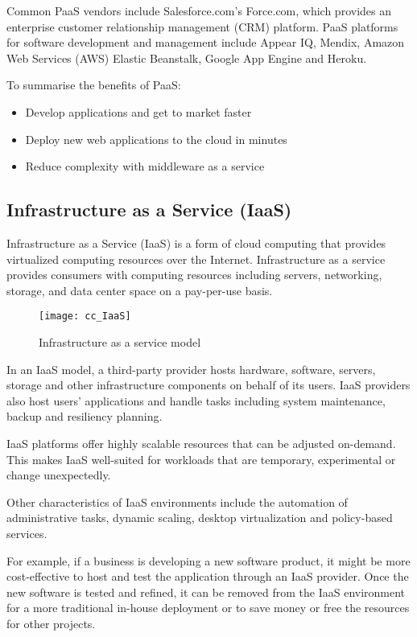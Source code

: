 Common PaaS vendors include Salesforce.com's Force.com, which provides an enterprise customer relationship management (CRM) platform. PaaS platforms for software development and management include Appear IQ, Mendix, Amazon Web Services (AWS) Elastic Beanstalk, Google App Engine and Heroku.

To summarise the benefits of PaaS:
\begin{itemize}
	\item Develop applications and get to market faster
	\item Deploy new web applications to the cloud in minutes
	\item Reduce complexity with middleware as a service
\end{itemize}

\subsection{Infrastructure as a Service (IaaS)}\label{ssec:IaaS}

Infrastructure as a Service (IaaS) is a form of cloud computing that provides virtualized computing resources over the Internet. Infrastructure as a service provides consumers with computing resources including servers, networking, storage, and data center space on a pay-per-use basis.

\begin{figure}[H]
	\begin{center}
		\texttt{[image: cc\_IaaS]}
		\caption{Infrastructure as a service model\cite{IBMcloud:IaaS}}
		\label{fig:cc_IaaS}
	\end{center}
	\vspace{-10pt}
\end{figure}

In an IaaS model, a third-party provider hosts hardware, software, servers, storage and other infrastructure components on behalf of its users. IaaS providers also host users' applications and handle tasks including system maintenance, backup and resiliency planning.

IaaS platforms offer highly scalable resources that can be adjusted on-demand. This makes IaaS well-suited for workloads that are temporary, experimental or change unexpectedly.

Other characteristics of IaaS environments include the automation of administrative tasks, dynamic scaling, desktop virtualization and policy-based services.

For example, if a business is developing a new software product, it might be more cost-effective to host and test the application through an IaaS provider. Once the new software is tested and refined, it can be removed from the IaaS environment for a more traditional in-house deployment or to save money or free the resources for other projects.

